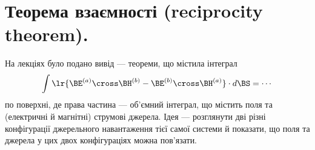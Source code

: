 %
%
\section{Теорема взаємності (reciprocity theorem).}
На лекціях було подано вивід  — теореми, що містила інтеграл 
\begin{equation}\label{eqn:reciprocityTheorem:360}
\int \lr{\BE^{(a)} \cross \BH^{(b)} - \BE^{(b)} \cross \BH^{(a)}} \cdot d\BS = \cdots
\end{equation}
по поверхні, де права частина — об'ємний інтеграл, що містить поля та (електричні й магнітні) струмові джерела.
Ідея — розглянути дві різні конфігурації джерельного навантаження тієї самої системи й показати, що поля та джерела у цих двох конфігураціях можна пов'язати.

